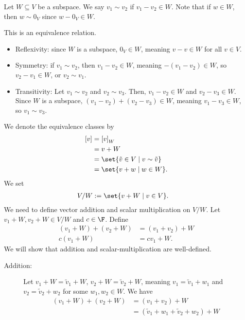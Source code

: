 \documentclass[10pt]{mypackage}
\begin{document}
\begin{definition}
  Let $W\subseteq V$ be a subspace. We say $v_1\sim v_2$ if $v_1 - v_2 \in W$. Note that if $w\in W$, then $w\sim 0_V$ since $w-0_V\in W$.\newline

  This is an equivalence relation.
  \begin{itemize}
    \item Reflexivity: since $W$ is a subspace, $0_V\in W$, meaning $v-v\in W$ for all $v\in V$.
    \item Symmetry: if $v_1\sim v_2$, then $v_1 - v_2 \in W$, meaning $-\left(v_1 - v_2\right)\in W$, so $v_2 - v_1\in W$, or $v_2 \sim v_1$.
    \item Transitivity: Let $v_1\sim v_2$ and $v_2\sim v_3$. Then, $v_1 - v_2\in W$ and $v_2 - v_3\in W$. Since $W$ is a subspace, $\left(v_1 - v_2\right) + \left(v_2 - v_3\right)\in W$, meaning $v_1 - v_3 \in W$, so $v_1 \sim v_3$.
  \end{itemize}
  We denote the equivalence classes by
  \begin{align*}
    \left[v\right] &= \left[v\right]_W\\
                   &= v+W\\
                   &= \set{\tilde{v}\in V\mid v\sim \tilde{v}}\\
                   &= \set{v+w\mid w\in W}.
  \end{align*}
  We set
  \begin{align*}
    V/W &:= \set{v + W\mid v\in V}.
  \end{align*}
  We need to define vector addition and scalar multiplication on $V/W$. Let $v_1 + W,v_2 + W\in V/W$ and $c\in\F$. Define
  \begin{align*}
    \left(v_1 + W\right) + \left(v_2 + W\right) &= \left(v_1 + v_2\right) + W\\
    c\left(v_1 + W\right) &= cv_1 + W.
  \end{align*}
  We will show that addition and scalar-multiplication are well-defined.
  \begin{description}
    \item[Addition:] Let $v_1 + W = \tilde{v}_1 + W$, $v_2 + W = \tilde{v}_2 + W$, meaning $v_1 = \tilde{v}_1 + w_1$ and $v_2 = \tilde{v}_2 + w_2$ for some $w_1,w_2 \in W$. We have
      \begin{align*}
        \left(v_1 + W\right) + \left(v_2 + W\right) &= \left(v_1 + v_2\right) + W\\
                                                    &= \left(\tilde{v}_1 + w_1 + \tilde{v}_2 + w_2\right) + W\\

\end{align*}
\end{description}
\end{definition}
\end{document}
